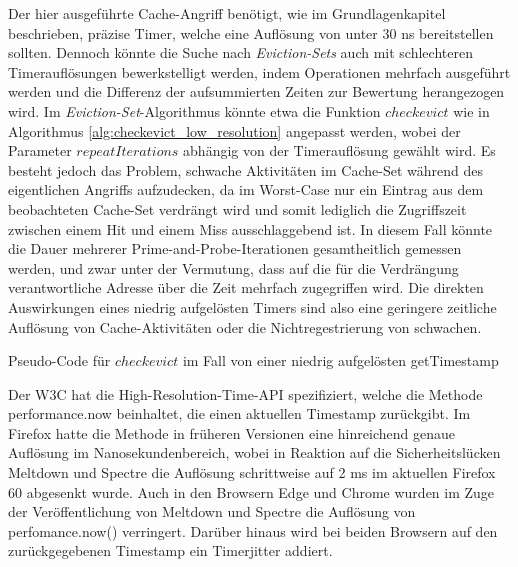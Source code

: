 Der hier ausgeführte Cache-Angriff benötigt, wie im Grundlagenkapitel beschrieben, präzise Timer, welche eine Auflösung von unter 30 ns bereitstellen sollten. Dennoch könnte die Suche nach \textit{Eviction-Sets} auch mit schlechteren Timerauflösungen bewerkstelligt werden, indem Operationen mehrfach ausgeführt werden und die Differenz der aufsummierten Zeiten zur Bewertung herangezogen wird.
Im \textit{Eviction-Set}-Algorithmus könnte etwa die Funktion $checkevict$ wie in Algorithmus \ref{alg:checkevict_low_resolution} angepasst werden, wobei der Parameter $repeatIterations$ abhängig von der Timerauflösung gewählt wird. 
Es besteht jedoch das Problem, schwache Aktivitäten im Cache-Set während des eigentlichen Angriffs aufzudecken, da im Worst-Case nur ein Eintrag aus dem beobachteten Cache-Set verdrängt wird und somit lediglich die Zugriffszeit zwischen einem Hit und einem Miss ausschlaggebend ist. 
In diesem Fall könnte die Dauer mehrerer Prime-and-Probe-Iterationen gesamtheitlich gemessen werden, und zwar unter der Vermutung, dass auf die für die Verdrängung verantwortliche Adresse über die Zeit mehrfach zugegriffen wird. %
Die direkten Auswirkungen eines niedrig aufgelösten Timers sind also eine geringere zeitliche Auflösung von Cache-Aktivitäten oder die Nichtregestrierung von schwachen.

\begin{algorithm}[h]
\DontPrintSemicolon
\caption{Pseudo-Code für $checkevict$ im Fall von einer niedrig aufgelösten getTimestamp}
\label{alg:checkevict_low_resolution}


\end{algorithm}

Der W3C hat die High-Resolution-Time-API spezifiziert, welche die Methode performance.now beinhaltet, die einen aktuellen Timestamp zurückgibt. Im Firefox hatte die Methode in früheren Versionen eine hinreichend genaue Auflösung im Nanosekundenbereich, wobei in Reaktion auf die Sicherheitslücken Meltdown und Spectre die Auflösung schrittweise auf 2 ms im aktuellen Firefox 60 abgesenkt wurde. 
Auch in den Browsern Edge und Chrome wurden im Zuge der Veröffentlichung von Meltdown und Spectre die Auflösung von perfomance.now() verringert.
Darüber hinaus wird bei beiden Browsern auf den zurückgegebenen Timestamp ein Timerjitter addiert.

